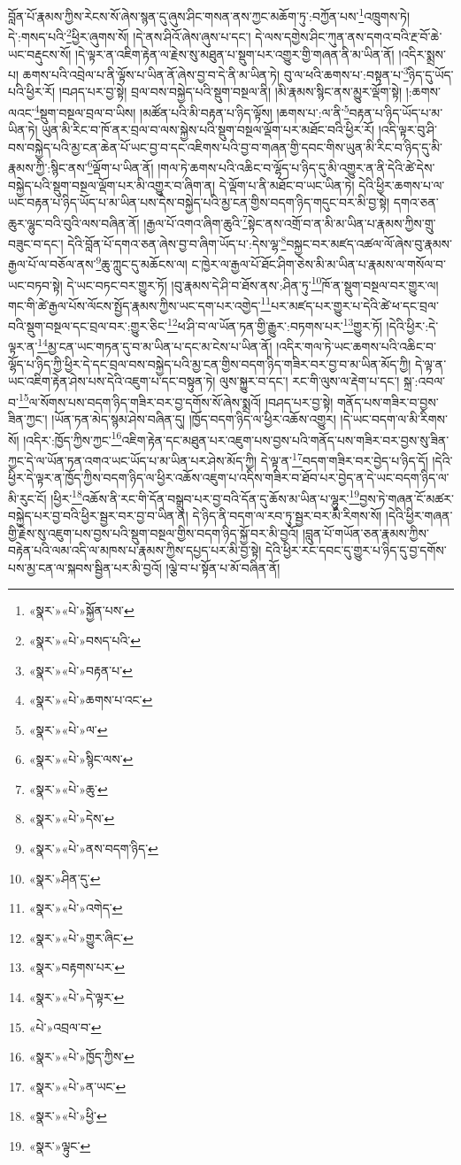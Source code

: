 བློན་པོ་རྣམས་ཀྱིས་རེངས་སོ་ཞེས་སྙན་དུ་ཞུས་ཤིང་གསན་ནས་ཀྱང་མཆོག་ཏུ་:བཀྱོན་པས་\footnote{«སྣར་»«པེ་»སྐྱོན་པས་}འཁྲུགས་ཏེ། དེ་:གསད་པའི་\footnote{«སྣར་»«པེ་»བསད་པའི་}ཕྱིར་ཞུགས་སོ། །དེ་ནས་ཤིའོ་ཞེས་ཞུས་པ་དང་། དེ་ལས་དགྱེས་ཤིང་ཀུན་ནས་དགའ་བའི་རྔ་བོ་ཆེ་ཡང་བརྡུངས་སོ། །དེ་ལྟར་ན་འཇིག་རྟེན་ལ་རྗེས་སུ་མཐུན་པ་སྡུག་པར་འགྱུར་གྱི་གཞན་ནི་མ་ཡིན་ནོ། །འདིར་སྨྲས་པ། ཆགས་པའི་འབྲེལ་པ་ནི་ལྟོས་པ་ཡིན་ནོ་ཞེས་བྱ་བ་དེ་ནི་མ་ཡིན་ཏེ། བུ་ལ་ཕའི་ཆགས་པ་:བསྟན་པ་\footnote{«སྣར་»«པེ་»བརྟན་པ་}ཉིད་དུ་ཡོད་པའི་ཕྱིར་རོ། །བཤད་པར་བྱ་སྟེ། བྲལ་བས་བསྐྱེད་པའི་སྡུག་བསྔལ་ནི། །མི་རྣམས་སྙིང་ནས་མྱུར་ལྡོག་སྟེ། །:ཆགས་ལའང་\footnote{«སྣར་»«པེ་»ཆགས་པ་འང་}སྡུག་བསྔལ་བྲལ་བ་ཡིས། །མཚོན་པའི་མི་བརྟན་པ་ཉིད་ལྟོས། །ཆགས་པ་:ལ་ནི་\footnote{«སྣར་»«པེ་»ལ་}བརྟན་པ་ཉིད་ཡོད་པ་མ་ཡིན་ཏེ། ཡུན་མི་རིང་བ་ཁོ་ནར་བྲལ་བ་ལས་སྐྱེས་པའི་སྡུག་བསྔལ་ལྡོག་པར་མཐོང་བའི་ཕྱིར་རོ། །འདི་ལྟར་བུ་ཤི་བས་བསྐྱེད་པའི་མྱ་ངན་ཆེན་པོ་ཡང་བྱ་བ་དང་འཇིགས་པའི་བྱ་བ་གཞན་གྱི་དབང་གིས་ཡུན་མི་རིང་བ་ཉིད་དུ་མི་རྣམས་ཀྱི་:སྙིང་ནས་\footnote{«སྣར་»«པེ་»སྙིང་ལས་}ལྡོག་པ་ཡིན་ནོ། །གལ་ཏེ་ཆགས་པའི་འཆིང་བ་ལྷོད་པ་ཉིད་དུ་མི་འགྱུར་ན་ནི་དེའི་ཚེ་དེས་བསྐྱེད་པའི་སྡུག་བསྔལ་ལྡོག་པར་མི་འགྱུར་བ་ཞིག་ན། དེ་ལྡོག་པ་ནི་མཐོང་བ་ཡང་ཡིན་ཏེ། དེའི་ཕྱིར་ཆགས་པ་ལ་ཡང་བརྟན་པ་ཉིད་ཡོད་པ་མ་ཡིན་པས་དེས་བསྐྱེད་པའི་མྱ་ངན་གྱིས་བདག་ཉིད་གདུང་བར་མི་བྱ་སྟེ། དགའ་ཅན་ཆུར་ལྷུང་བའི་བུའི་ལས་བཞིན་ནོ། །རྒྱལ་པོ་འགའ་ཞིག་ཆུའི་\footnote{«སྣར་»«པེ་»ཆུ་}སྟེང་ནས་འགྲོ་བ་ན་མི་མ་ཡིན་པ་རྣམས་ཀྱིས་གྲུ་བཟུང་བ་དང་། དེའི་བློན་པོ་དགའ་ཅན་ཞེས་བྱ་བ་ཞིག་ཡོད་པ་:དེས་ལྷ་\footnote{«སྣར་»«པེ་»དེས་}བསྐྱང་བར་མཛད་འཚལ་ལོ་ཞེས་བུ་རྣམས་རྒྱལ་པོ་ལ་བཅོལ་ནས་\footnote{«སྣར་»«པེ་»ནས་བདག་ཉིད་}ཆུ་ཀླུང་དུ་མཆོངས་ལ། ང་ཁྱེར་ལ་རྒྱལ་པོ་ཐོང་ཤིག་ཅེས་མི་མ་ཡིན་པ་རྣམས་ལ་གསོལ་བ་ཡང་བཏབ་སྟེ། དེ་ཡང་བཏང་བར་གྱུར་ཏོ། །བུ་རྣམས་དེ་ཤི་བ་ཐོས་ནས་:ཤིན་ཏུ་\footnote{«སྣར་»ཤིན་དུ་}ཁོ་ན་སྡུག་བསྔལ་བར་གྱུར་ལ། གང་གི་ཚེ་རྒྱལ་པོས་ལོངས་སྤྱོད་རྣམས་ཀྱིས་ཡང་དག་པར་འགྱེད་\footnote{«སྣར་»«པེ་»འགེད་}པར་མཛད་པར་གྱུར་པ་དེའི་ཚེ་ཕ་དང་བྲལ་བའི་སྡུག་བསྔལ་དང་བྲལ་བར་:གྱུར་ཅིང་\footnote{«སྣར་»«པེ་»གྱུར་ཞིང་}ཕ་ཤི་བ་ལ་ཡོན་ཏན་གྱི་རྒྱུར་:བཏགས་པར་\footnote{«སྣར་»བརྟགས་པར་}གྱུར་ཏོ། །དེའི་ཕྱིར་:དེ་ལྟར་ན་\footnote{«སྣར་»«པེ་»དེ་ལྟར་}མྱ་ངན་ཡང་གཏན་དུ་བ་མ་ཡིན་པ་དང་མ་ངེས་པ་ཡིན་ནོ། །འདིར་གལ་ཏེ་ཡང་ཆགས་པའི་འཆིང་བ་ལྷོད་པ་ཉིད་ཀྱི་ཕྱིར་དེ་དང་བྲལ་བས་བསྐྱེད་པའི་མྱ་ངན་གྱིས་བདག་ཉིད་གཟིར་བར་བྱ་བ་མ་ཡིན་མོད་ཀྱི། དེ་ལྟ་ན་ཡང་འཇིག་རྟེན་ཤེས་པས་དེའི་འཇུག་པ་དང་བསྟུན་ཏེ། ལུས་སྐྱུར་བ་དང་། རང་གི་ལུས་ལ་རྡེག་པ་དང་། སྐྲ་:འབལ་བ་\footnote{«པེ་»འབྲལ་བ་}ལ་སོགས་པས་བདག་ཉིད་གཟིར་བར་བྱ་དགོས་སོ་ཞེས་སྨྲའོ། །བཤད་པར་བྱ་སྟེ། གནོད་པས་གཟིར་བ་བྱས་ཟིན་ཀྱང་། །ཡོན་ཏན་མེད་སྙམ་ཤེས་བཞིན་དུ། །ཁྱོད་བདག་ཉིད་ལ་ཕྱིར་འཆོས་འགྱུར། །དེ་ཡང་བདག་ལ་མི་རིགས་སོ། །འདིར་:ཁྱོད་ཀྱིས་ཀྱང་\footnote{«སྣར་»«པེ་»ཁྱོད་ཀྱིས་}འཇིག་རྟེན་དང་མཐུན་པར་འཇུག་པས་བྱས་པའི་གནོད་པས་གཟིར་བར་བྱས་སུ་ཟིན་ཀྱང་དེ་ལ་ཡོན་ཏན་འགའ་ཡང་ཡོད་པ་མ་ཡིན་པར་ཤེས་མོད་ཀྱི། དེ་ལྟ་ན་\footnote{«སྣར་»«པེ་»ན་ཡང་}བདག་གཟིར་བར་བྱེད་པ་ཉིད་དོ། །དེའི་ཕྱིར་དེ་ལྟར་ན་ཁྱོད་ཀྱིས་བདག་ཉིད་ལ་ཕྱིར་འཆོས་འཇུག་པ་འདིས་གཟིར་བ་ཐོབ་པར་བྱེད་ན་དེ་ཡང་བདག་ཉིད་ལ་མི་རུང་ངོ། །ཕྱིར་\footnote{«སྣར་»«པེ་»ཕྱི་}འཆོས་ནི་རང་གི་དོན་བསྒྲུབ་པར་བྱ་བའི་དོན་དུ་ཆོས་མ་ཡིན་པ་ལྷུར་\footnote{«སྣར་»ལྟུང་}བྱས་ཏེ་གཞན་ངོ་མཚར་བསྐྱེད་པར་བྱ་བའི་ཕྱིར་སྦྱར་བར་བྱ་བ་ཡིན་ན། དེ་ཉིད་ནི་བདག་ལ་རབ་ཏུ་སྦྱར་བར་མི་རིགས་སོ། །དེའི་ཕྱིར་གཞན་གྱི་རྗེས་སུ་འཇུག་པས་བྱས་པའི་སྡུག་བསྔལ་གྱིས་བདག་ཉིད་སྐྱོ་བར་མི་བྱའོ། །བླུན་པོ་གཡོན་ཅན་རྣམས་ཀྱིས་བརྟེན་པའི་ལམ་འདི་ལ་མཁས་པ་རྣམས་ཀྱིས་དཔྱད་པར་མི་བྱ་སྟེ། དེའི་ཕྱིར་རང་དབང་དུ་གྱུར་པ་ཉིད་དུ་བྱ་དགོས་པས་མྱ་ངན་ལ་སྐབས་སྦྱིན་པར་མི་བྱའོ། །ལྕེ་བ་པ་སྟོན་པ་མོ་བཞིན་ནོ། 